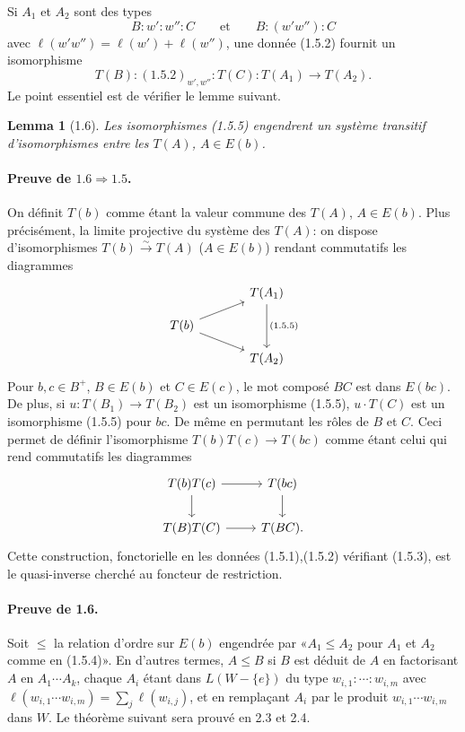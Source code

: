 \documentclass[11pt]{article}
\newtheorem{lemma}[theorem]{Lemma}
\begin{document}
Si $A_1$ et $A_2$ sont des types
\begin{equation}
 B:w':w'':C\qquad\text{et}\qquad B:(w'w''):C
\tag{1.5.4}
\end{equation}
avec $\ell(w'w'')=\ell(w')+\ell(w'')$, une donnée (1.5.2) fournit un isomorphisme
\begin{equation}
 T(B):(1.5.2)_{w',w''}:T(C):T(A_1)\longrightarrow T(A_2).
\tag{1.5.5}
\end{equation}
Le point essentiel est de vérifier le lemme suivant.

\begin{lemma}[1.6]
Les isomorphismes (1.5.5) engendrent un système transitif d'isomorphismes entre les $T(A)$, $A\in E(b)$.
\end{lemma}

\paragraph{Preuve de $1.6\Rightarrow1.5$.} On définit $T(b)$ comme étant la valeur commune des $T(A)$, $A\in E(b)$. Plus précisément, la limite projective du système des $T(A)$: on dispose d'isomorphismes $T(b)\xrightarrow{\sim}T(A)$ ($A\in E(b)$) rendant commutatifs les diagrammes
\[
\begin{tikzcd}[row sep=small,column sep=large]
& T(A_1) \arrow[dd,"(1.5.5)"]\\
T(b) \arrow[ur] \arrow[dr] & \\
& T(A_2)
\end{tikzcd}
\]
Pour $b,c\in B^+$, $B\in E(b)$ et $C\in E(c)$, le mot composé $BC$ est dans $E(bc)$. De plus, si $u:T(B_1)\to T(B_2)$ est un isomorphisme (1.5.5), $u\cdot T(C)$ est un isomorphisme (1.5.5) pour $bc$. De même en permutant les rôles de $B$ et $C$. Ceci permet de définir l'isomorphisme $T(b)T(c)\to T(bc)$ comme étant celui qui rend commutatifs les diagrammes
\[
\begin{tikzcd}
T(b)T(c) \arrow[r] \arrow[d] & T(bc) \arrow[d]\\
T(B)T(C) \arrow[r] & T(BC).
\end{tikzcd}
\]
Cette construction, fonctorielle en les données (1.5.1),(1.5.2) vérifiant (1.5.3), est le quasi-inverse cherché au foncteur de restriction.

\paragraph{Preuve de 1.6.} Soit $\leq$ la relation d'ordre sur $E(b)$ engendrée par «$A_1\leq A_2$ pour $A_1$ et $A_2$ comme en (1.5.4)». En d'autres termes, $A\leq B$ si $B$ est déduit de $A$ en factorisant $A$ en $A_1\cdots A_k$, chaque $A_i$ étant dans $L(W-\{e\})$ du type $w_{i,1}:\cdots:w_{i,m}$ avec $\ell(w_{i,1}\cdots w_{i,m})=\sum_j\ell(w_{i,j})$, et en remplaçant $A_i$ par le produit $w_{i,1}\cdots w_{i,m}$ dans $W$. Le théorème suivant sera prouvé en 2.3 et 2.4.
\end{document}
